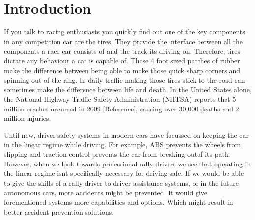 \section{Introduction}
If you talk to racing enthusiasts you quickly find out one of the key components in any competition car are the tires. They provide the interface between all the components a race car consists of and the track it\textquotesingle s driving on. Therefore, tires dictate any behaviour a car is capable of. Those 4 foot sized patches of rubber make the difference between being able to make those quick sharp corners and spinning out of the ring. In daily traffic making those tires stick to the road can sometimes make the difference between life and death. In the United States alone, the National Highway Traffic Safety Administration (NHTSA) reports that 5 million crashes occurred in 2009 [Reference], causing over 30,000 deaths and 2 million injuries. 

Until now, driver safety systems in modern-cars have focussed on keeping the car in the linear regime while driving. For example, ABS prevents the wheels from slipping and traction control prevents the car from \textquotesingle breaking out\textquotesingle  of its path. However, when we look towards professional rally drivers we see that operating in the linear regime isn\textquotesingle t specifically necessary for driving safe. If we would be able to give the skills of a rally driver to driver assistance systems, or in the future autonomous cars, more accidents might be prevented. It would give forementioned systems more capabilities and options. Which might result in better accident prevention solutions.

